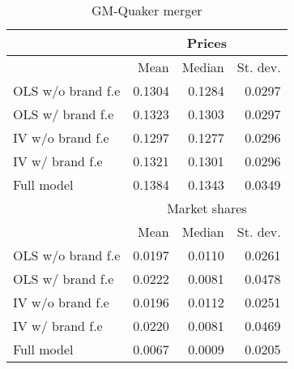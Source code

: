 \documentclass[12pt,english]{article}
\begin{document}
\begin{enumerate}
\begin{table}[H]
  \centering
  \caption{GM-Quaker merger}
    \begin{tabular}{lrrr}
    \hline
          & \multicolumn{3}{c}{Prices} \\
    \hline
          & Mean  & Median & St. dev. \\
          \hline
    OLS w/o brand f.e & 0.1304 & 0.1284 & 0.0297 \\
    OLS w/ brand f.e & 0.1323 & 0.1303 & 0.0297 \\
    IV w/o brand f.e & 0.1297 & 0.1277 & 0.0296 \\
    IV w/ brand f.e & 0.1321 & 0.1301 & 0.0296 \\
    Full model & 0.1384 & 0.1343 & 0.0349 \\
    \hline
          & \multicolumn{3}{c}{Market shares} \\
          \hline
          & Mean  & Median & St. dev. \\
          \hline
    OLS w/o brand f.e & 0.0197 & 0.0110 & 0.0261 \\
    OLS w/ brand f.e & 0.0222 & 0.0081 & 0.0478 \\
    IV w/o brand f.e & 0.0196 & 0.0112 & 0.0251 \\
    IV w/ brand f.e & 0.0220 & 0.0081 & 0.0469 \\
    Full model & 0.0067 & 0.0009 & 0.0205 \\
    \hline
    \end{tabular}%
  \label{t5}%
\end{table}


\end{enumerate}
\end{document}
